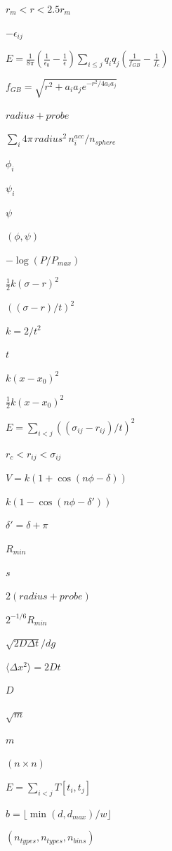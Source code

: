 \documentclass{article}
\begin{document}
$r_m < r < 2.5 r_m$
\pagebreak

$-\epsilon_{ij}$
\pagebreak

$E = \frac{1}{8\pi}(\frac{1}{\epsilon_0} - \frac{1}{\epsilon})
\sum_{i \le j} q_i q_j (\frac{1}{f_{GB}} - \frac{1}{f_c})$
\pagebreak

$f_{GB} = \sqrt{r^2 + a_i a_j e^{-r^2/4a_ia_j}}$
\pagebreak

$radius + probe$
\pagebreak

$\sum_i 4\pi\, radius^2\, n_i^{acc} / n_{sphere}$
\pagebreak

$\phi_i$
\pagebreak

$\psi_i$
\pagebreak

$\psi$
\pagebreak

$(\phi, \psi)$
\pagebreak

$-\log(P/P_{max})$
\pagebreak

$\frac{1}{2}k(\sigma - r)^2$
\pagebreak

$((\sigma - r)/t)^2$
\pagebreak

$k = 2/t^2$
\pagebreak

$t$
\pagebreak

$k(x - x_0)^2$
\pagebreak

$\frac{1}{2}k(x-x_0)^2$
\pagebreak

$E = \sum_{i<j} ((\sigma_{ij} - r_{ij})/t)^2$
\pagebreak

$r_c < r_{ij} < \sigma_{ij}$
\pagebreak

$V = k(1 + \cos(n\phi - \delta))$
\pagebreak

$k(1 - \cos(n\phi - \delta'))$
\pagebreak

$\delta' = \delta + \pi$
\pagebreak

$R_{min}$
\pagebreak

$s$
\pagebreak

$2(radius + probe)$
\pagebreak

$2^{-1/6} R_{min}$
\pagebreak

$\sqrt{2 D \Delta t}/dg$
\pagebreak

$\langle \Delta x^2\rangle = 2 D t$
\pagebreak

$D$
\pagebreak

$\sqrt{m}$
\pagebreak

$m$
\pagebreak

$(n \times n)$
\pagebreak

$E = \sum_{i<j} T[t_i, t_j]$
\pagebreak

$b = \lfloor \min(d, d_{max}) / w \rfloor$
\pagebreak

$(n_{types}, n_{types}, n_{bins})$
\pagebreak
\end{document}
